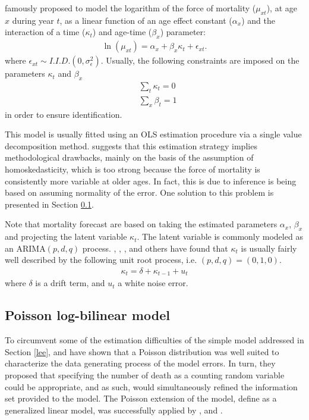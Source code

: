 \documentclass[AER, draftmode]{AEA}
\begin{document}
\cite{Lee1992} famously proposed to model the logarithm of the force of mortality ($\mu_{xt}$), at age $x$ during year $t$, as a linear function of an age effect constant ($\alpha_x$) and the interaction of a time ($\kappa_t$) and age-time ($\beta_x$) parameter:
\begin{align}\label{eq:lee-carter}
\ln(\mu_{xt})=\alpha_x+\beta_x\kappa_t+\epsilon_{xt}.
\end{align} 
where $\epsilon_{xt} \sim I.I.D.(0,\sigma_\epsilon^2)$. Usually, the following constraints are imposed on the parameters $\kappa_t$ and $\beta_x$
\begin{align}
& \sum_t \kappa_t = 0 \\
& \sum_x \beta_t = 1
\end{align}
in order to ensure identification.

This model is usually fitted using an OLS estimation procedure via a single value decomposition method. \cite{Alho2000} suggests that this estimation strategy implies methodological drawbacks, mainly on the basis of the assumption of homoskedasticity, which is too strong because the force of mortality is consistently more variable at older ages. In fact, this is due to inference is being based on assuming normality of the error. One solution to this problem is presented in Section \ref{poisson}.

Note that mortality forecast are based on taking the estimated parameters $\alpha_x$, $\beta_x$ and projecting the latent variable $\kappa_t$.  The latent variable is commonly modeled as an ARIMA$(p,d,q)$ process. \cite{Lee1992}, \cite{Lee2001}, \cite{Hanewald2009}, and others have found that $\kappa_t$ is usually fairly well described by the following unit root process, i.e. $(p,d,q) = (0,1,0)$.
\begin{align}
\kappa_t = \delta + \kappa_{t-1} +u_t
\end{align}
where $\delta$ is a drift term, and $u_t$ a white noise error.

\subsection{Poisson log-bilinear model \citep{Brouhns2002}} \label{poisson}

To circumvent some of the estimation difficulties of the simple \cite{Lee1992} model addressed in Section \ref{lee}, \cite{Brillinger1986} and \cite{Macdonald1996} have shown that a Poisson distribution was well suited to characterize the data generating process of the \cite{Lee1992} model errors. In turn, they proposed that specifying the number of death as a counting random variable could be appropriate, and as such, would simultaneously refined the information set provided to the model. The Poisson extension of the \cite{Lee1992} model, define as a generalized linear model, was successfully applied by \cite{Brouhns2002}, \cite{Hanewald2009} and \cite{Sithole2000}. 
\end{document}
